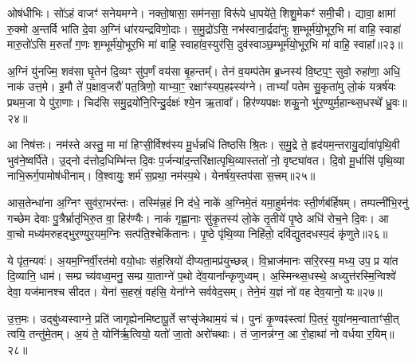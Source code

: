 ओष॑धीभिः। सो॑\-ऽहं वाजꣳ॑ सनेयमग्ने। नक्तो॒षासा॒ सम॑नसा॒ विरू॑पे धा॒पये॑ते॒ शिशु॒मेकꣳ॑ समी॒ची। द्यावा॒ क्षामा॑ रु॒क्मो अ॒न्तर्वि भा॑ति दे॒वा अ॒ग्निं धा॑रयन्द्रविणो॒दाः। स॒मु॒द्रो॑\-ऽसि॒ नभ॑स्वाना॒र्द्रदा॑नुः श॒म्भूर्म॑यो॒भूर॒भि मा॑ वाहि॒ स्वाहा॑ मारु॒तो॑\-ऽसि म॒रुतां᳚ ग॒णः श॒म्भूर्म॑यो॒भूर॒भि मा॑ वाहि॒ स्वाहा॑व॒स्युर॑सि॒ दुव॑स्वाञ्छ॒म्भूर्म॑यो॒भूर॒भि मा॑ वाहि॒ स्वाहा᳚॥२३॥

{\anuvakamend[{धने᳚ष्व॒पो दुव॑स्वाञ्छ॒म्भूर्म॑यो॒भूर॒भि मा॒ द्वे च॑॥12॥}]}

अ॒ग्निं यु॑नज्मि॒ शव॑सा घृ॒तेन॑ दि॒व्यꣳ सु॑प॒र्णं वय॑सा बृ॒हन्तम्᳚। तेन॑ व॒यम्प॑तेम ब्र॒ध्नस्य॑ वि॒ष्टप॒ꣳ॒ सुवो॒ रुहा॑णा॒ अधि॒ नाक॑ उत्त॒मे। इ॒मौ ते॑ प॒क्षाव॒जरौ॑ पत॒त्रिणो॒ याभ्या॒ꣳ॒ रक्षाꣳ॑स्यप॒हꣴस्य॑ग्ने। ता\-भ्यां᳚ पतेम सु॒कृता॑मु लो॒कं यत्रर्\mbox{}ष॑यः प्रथम॒जा ये पु॑रा॒णाः। चिद॑सि समु॒द्रयो॑नि॒रिन्दु॒र्दक्षः॑ श्ये॒न ऋ॒तावा᳚। हिर॑ण्यपक्षः शकु॒नो भु॑र॒ण्युर्म॒हान्थ्स॒धस्थे᳚ ध्रु॒वः॥२४॥

आ निष॑त्तः। नम॑स्ते अस्तु॒ मा मा॑ हिꣳसी॒र्विश्व॑स्य मू॒र्धन्नधि॑ तिष्ठसि श्रि॒तः। स॒मु॒द्रे ते॒ हृद॑यम॒न्तरायु॒र्द्यावा॑पृथि॒वी भुव॑ने॒ष्वर्पि॑ते। उ॒द्नो द॑त्तोद॒धिम्भि॑न्त दि॒वः प॒र्जन्या॑द॒न्तरि॑क्षात्पृथि॒व्यास्ततो॑ नो॒ वृष्ट्या॑वत। दि॒वो मू॒र्धासि॑ पृथि॒व्या नाभि॒रूर्ग॒पामोष॑धीनाम्। वि॒श्वायुः॒ शर्म॑ स॒प्रथा॒ नम॑स्प॒थे। येनर्\mbox{}ष॑य॒स्तप॑सा स॒त्त्रम्॥२५॥

आस॒तेन्धा॑ना अ॒ग्निꣳ सुव॑रा॒भर॑न्तः। तस्मि॑न्न॒हं नि द॑धे॒ नाके॑ अ॒ग्निमे॒तं यमा॒हुर्मन॑वः स्ती॒र्णब॑र्\mbox{}हिषम्। तम्पत्नी॑भि॒रनु॑ गच्छेम देवाः पु॒त्रैर्भ्रातृ॑भिरु॒त वा॒ हिर॑ण्यैः। नाकं॑ गृह्णा॒नाः सु॑कृ॒तस्य॑ लो॒के तृ॒तीये॑ पृ॒ष्ठे अधि॑ रोच॒ने दि॒वः। आ वा॒चो मध्य॑मरुहद्भुर॒ण्युर॒यम॒ग्निः सत्प॑ति॒श्चेकि॑तानः। पृ॒ष्ठे पृ॑थि॒व्या निहि॑तो॒ दवि॑द्युतदधस्प॒दं कृ॑णुते॥२६॥

ये पृ॑त॒न्यवः॑। अ॒यम॒ग्निर्वी॒रत॑मो वयो॒धाः स॑ह॒स्रियो॑ दीप्यता॒मप्र॑युच्छन्न्। वि॒भ्राज॑मानः सरि॒रस्य॒ मध्य॒ उप॒ प्र या॑त दि॒व्यानि॒ धाम॑। सम्प्र च्य॑वध्व॒मनु॒ सम्प्र या॒ताग्ने॑ प॒थो दे॑व॒याना᳚न्कृणुध्वम्। अ॒स्मिन्थ्स॒धस्थे॒ अध्युत्त॑रस्मि॒न्विश्वे॑ देवा॒ यज॑मानश्च सीदत। येना॑ स॒हस्रं॒ वह॑सि॒ येना᳚ग्ने सर्ववेद॒सम्। तेने॒मं य॒ज्ञं नो॑ वह देव॒यानो॒ यः॥२७॥

उ॒त्त॒मः। उद्बु॑ध्यस्वाग्ने॒ प्रति॑ जागृह्येनमिष्टापू॒र्ते सꣳसृ॑जेथाम॒यं च॑। पुनः॑ कृ॒ण्वꣴस्त्वा॑ पि॒तरं॒ युवा॑नम॒न्वाताꣳ॑सी॒त् त्वयि॒ तन्तु॑मे॒तम्। अ॒यं ते॒ योनि॑र्\mbox{}ऋ॒त्वियो॒ यतो॑ जा॒तो अरो॑चथाः। तं जा॒नन्न॑ग्न॒ आ रो॒हाथा॑ नो वर्धया र॒यिम्॥२८॥

{\anuvakamend[{ध्रु॒वः स॒त्रङ्कृ॑णुते॒ यः स॒प्तत्रिꣳ॑शच्च॥13॥}]}

